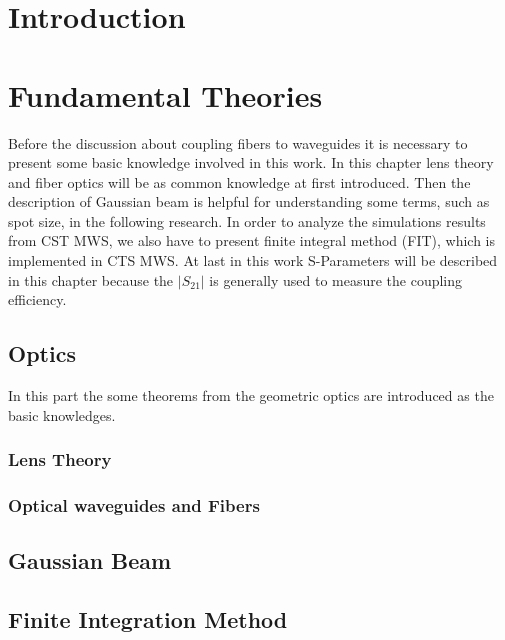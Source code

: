 
\chapter{Introduction}



\chapter{Fundamental Theories}
\label{chp:background}
Before the discussion about coupling fibers to waveguides it is necessary to present some basic knowledge involved in this work.  In this chapter lens theory and fiber optics will be as common knowledge at first introduced. Then the description of Gaussian beam is helpful for understanding some terms, such as spot size, in the following research.  
In order to analyze the simulations results from CST MWS, we also have to present finite integral method (FIT), which is implemented in CTS MWS. At last in this work S-Parameters will be described in this chapter because the $|S_{21}|$ is generally used to measure the coupling efficiency. 

\section{Optics}
\label{sect:background_optics}
In this part the  some theorems from the geometric optics  are introduced as the basic knowledges.
\subsection{Lens Theory}

\subsection{Optical waveguides and Fibers}


\section{Gaussian Beam}
\label{sect:gaussian_beam}


\section{Finite Integration Method}



